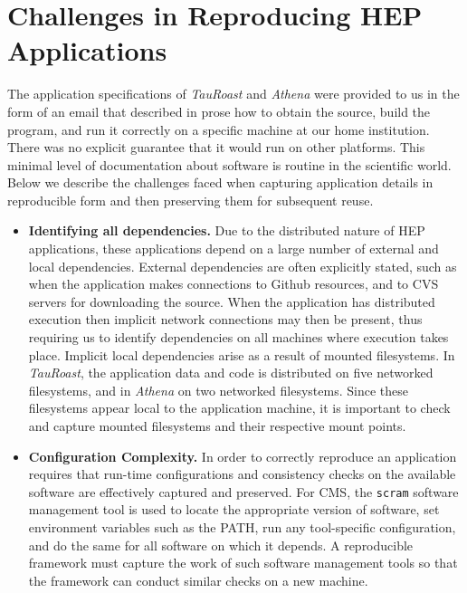\section{Challenges in Reproducing HEP Applications}

The application specifications of \emph{TauRoast} and \emph{Athena} were provided to us in the form of an
email that described in prose how to obtain the source,
build the program, and run it correctly on a specific
machine at our home institution.  There was no explicit guarantee that
it would run on other platforms. This minimal level of documentation about software is routine in the scientific world. 
Below we describe the challenges faced when capturing application details in reproducible form and then preserving them for subsequent reuse.

\begin{itemize}

\item {\bf Identifying all dependencies.}  Due to the distributed nature of HEP applications, these applications depend on a large number of external and local dependencies.
External dependencies are often explicitly stated, such as when the application makes connections to Github resources, and to CVS servers for downloading the source. 
When the application has distributed execution then implicit network connections may then be present, thus requiring us to identify dependencies on all machines where execution takes place. 
Implicit local dependencies arise as a result of mounted filesystems. In \emph{TauRoast}, the application data and code is distributed on five networked filesystems, and in \emph{Athena} on two networked filesystems. 
Since these filesystems appear local to the application machine, it is important to check and capture mounted filesystems and their respective mount points. 

\item {\bf Configuration Complexity.} In order to correctly reproduce an application requires that run-time configurations and consistency checks on the available software are effectively captured and preserved. 
For CMS,  the {\tt scram} software management tool is used to locate
the appropriate version of software,  set environment variables such as the PATH, run any
tool-specific configuration, and do the same for all software on which it depends. A reproducible framework must capture the work of such software management tools so that the framework can conduct similar
checks on a new machine. 


\end{itemize}
